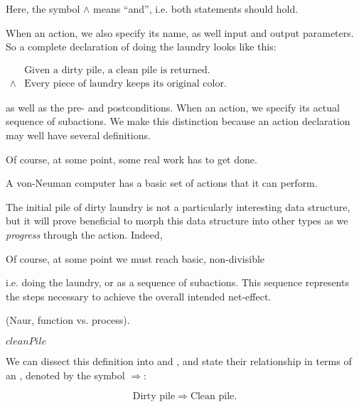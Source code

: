 Here, the symbol $\wedge$ means ``and'', i.e. both statements should hold.

When  an action, we also specify its name, as well input and
output parameters. So a complete declaration of doing the laundry looks like
this:

\begin{codebox}
\zi
$\begin{array}{ll}
&\text{Given a dirty pile, a clean pile is returned.}\\
\wedge&\text{Every piece of laundry keeps its original color.}
\end{array}$
\end{codebox}



as well as the pre- and postconditions. When 
an action, we specify its actual sequence of subactions. We make this
distinction because an action declaration may well have several definitions.

Of course, at some point, some real work has to get done.

A von-Neuman computer has a basic set of actions that it can perform.


The initial pile of dirty laundry is not a particularly interesting data
structure, but it will prove beneficial to morph this data structure into other
types as we \emph{progress} through the action. Indeed, 

Of course, at some point we must reach basic, non-divisible 


 i.e.  doing
the laundry, or as a sequence of subactions. This sequence represents the steps
necessary to achieve the overall intended net-effect.


(Naur,
function vs. process).

\begin{codebox}
\li \Return $cleanPile$
\end{codebox}

We can dissect this definition into
 and , and state their relationship in
terms of an , denoted by the symbol $\Rightarrow$:

\begin{equation}
\text{Dirty pile}\Rightarrow \text{Clean pile}.
\end{equation}



